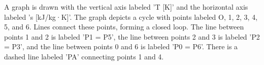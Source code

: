 A graph is drawn with the vertical axis labeled 'T [K]' and the horizontal axis labeled 's [kJ/kg·K]'. The graph depicts a cycle with points labeled O, 1, 2, 3, 4, 5, and 6. Lines connect these points, forming a closed loop. The line between points 1 and 2 is labeled 'P1 = P5', the line between points 2 and 3 is labeled 'P2 = P3', and the line between points 0 and 6 is labeled 'P0 = P6'. There is a dashed line labeled 'PA' connecting points 1 and 4.